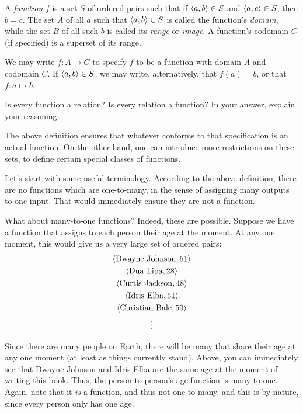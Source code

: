 \begin{defn}[Function] A \emph{function} $f$ is a set $S$ of ordered pairs such that if $\langle a,b\rangle \in S$ and $\langle a, c\rangle \in S$, then $b=c$. The set $A$ of all $a$ such that $\langle a, b\rangle \in S$ is called the function's \emph{domain}, while the set $B$ of all such $b$ is called its \emph{range} or \emph{image}. A function's codomain $C$ (if specified) is a superset of its range. 
	
We may write $f: A \to C$ to specify $f$ to be a function with domain $A$ and codomain $C$. If $\langle a, b\rangle \in S$, we may write, alternatively, that $f(a)=b$, or that $f: a \mapsto b$.   
\end{defn}

\begin{exc}
Is every function a relation? Is every relation a function? In your answer, explain your reasoning. 
\end{exc}


The above definition ensures that whatever conforms to that specification is an actual function. On the other hand, one can introduce more restrictions on these sets, to define certain special classes of functions. 

Let's start with some useful terminology. According to the above definition, there are no functions which are one-to-many, in the sense of assigning many outputs to one input. That would immediately ensure they are not a function. 

What about many-to-one functions? Indeed, these are possible. Suppose we have a function that assigns to each person their age at the moment. At any one moment, this would give us a very large set of ordered pairs:
\begin{gather*}
	\langle\text{Dwayne Johnson}, 51\rangle\\
	\langle\text{Dua Lipa}, 28\rangle\\
	\langle\text{Curtis Jackson}, 48\rangle\\
	\langle\text{Idris Elba}, 51\rangle\\
	\langle\text{Christian Bale}, 50\rangle\\
	\vdots
\end{gather*}

Since there are many people on Earth, there will be many that share their age at any one moment (at least as things currently stand). Above, you can immediately see that Dwayne Johnson and Idris Elba are the same age at the moment of writing this book. Thus, the person-to-person's-age function is many-to-one. Again, note that it \textit{is} a function, and thus not one-to-many, and this is by nature, since every person only has one age.

